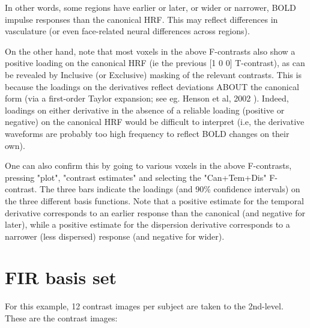 \documentclass[a4paper,titlepage]{book}
\begin{document}
In other words, some regions have earlier or later, or wider or narrower, BOLD impulse responses than the canonical HRF. This may reflect differences in vasculature (or even face-related neural differences across regions).  

On the other hand, note that most voxels in the above F-contrasts also show a positive loading on the canonical HRF (ie the previous [1 0 0] T-contrast), as can be revealed by Inclusive (or Exclusive) masking of the relevant contrasts. This is because the loadings on the derivatives reflect deviations ABOUT the canonical form (via a first-order Taylor expansion; see eg. Henson et al, 2002 \cite{rnah_latency}). Indeed, loadings on either derivative in the absence of a reliable loading (positive or negative) on the canonical HRF would be difficult to interpret (i.e, the derivative waveforms are probably too high frequency to reflect BOLD changes on their own).   

One can also confirm this by going to various voxels in the above F-contrasts, pressing "plot", "contrast estimates" and selecting the "Can+Tem+Dis" F-contrast. The three bars indicate the loadings (and 90\% confidence intervals) on the three different basis functions. Note that a positive estimate for the temporal derivative corresponds to an earlier response than the canonical (and negative for later), while a positive estimate for the dispersion derivative corresponds to a narrower (less dispersed) response (and negative for wider).

\section{FIR basis set}

For this example, 12 contrast images per subject are taken to the 2nd-level. These are the contrast images:
\end{document}
